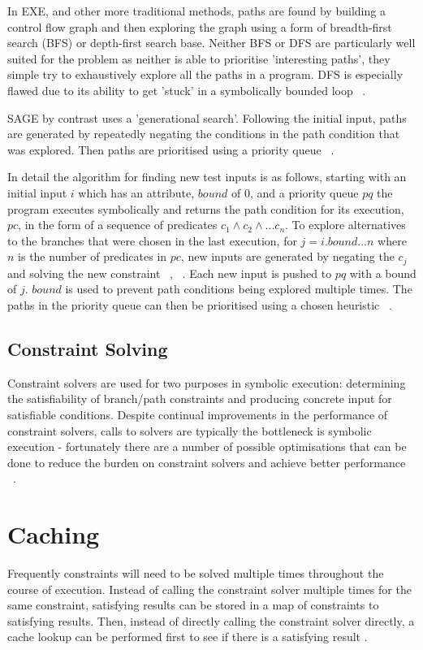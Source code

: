 \documentclass[]{final_report}
\begin{document}
In EXE, and other more traditional methods, paths are found by building a control flow graph and then exploring the graph using a form of breadth-first search (BFS) or depth-first search base. Neither BFS or DFS are particularly well suited for the problem as neither is able to prioritise 'interesting paths', they simple try to exhaustively explore all the paths in a program. DFS is especially flawed due to its ability to get 'stuck' in a symbolically bounded loop ~\cite{cadar2008exe}. 

SAGE by contrast uses a 'generational search'. Following the initial input, paths are generated by repeatedly negating the conditions in the path condition that was explored. Then paths are prioritised using a priority queue ~\cite{godefroid2005dart}.

In detail the algorithm for finding new test inputs is as follows, starting with an initial input $i$ which has an attribute, $bound$ of 0, and a priority queue $pq$ the program executes symbolically and returns the path condition for its execution, $pc$, in the form of a sequence of predicates $c_1 \land c_2 \land ... c_n $.  To explore alternatives to the branches that were chosen in the last execution, for $j = i.bound ... n$ where $n$ is the number of predicates in $pc$,  new inputs are generated by negating the $c_j$ and solving the new constraint ~\cite{godefroid2005dart}, ~\cite{godefroid2008grammar}.  Each new input is pushed to $pq$ with a bound of $j$. $bound$ is used to prevent path conditions being explored multiple times. The paths in the priority queue can then be prioritised using a chosen heuristic ~\cite{cadar2013symbolic}. 

\subsection{Constraint Solving}

Constraint solvers are used for two purposes in symbolic execution: determining the satisfiability of branch/path constraints and producing concrete input for satisfiable conditions. Despite continual improvements in the performance of constraint solvers, calls to solvers are typically the bottleneck is symbolic execution - fortunately there are a number of possible optimisations that can be done to reduce the burden on constraint solvers and achieve better performance ~\cite{cadar2013symbolic}.

\section{Caching}
Frequently constraints will need to be solved multiple times throughout the course of execution. Instead of calling the constraint solver multiple times for the same constraint, satisfying results can be stored in a map of constraints to satisfying results. Then, instead of directly calling the constraint solver directly, a cache lookup can be performed first to see if there is a satisfying result \cite{cadar2008klee}.
\end{document}

